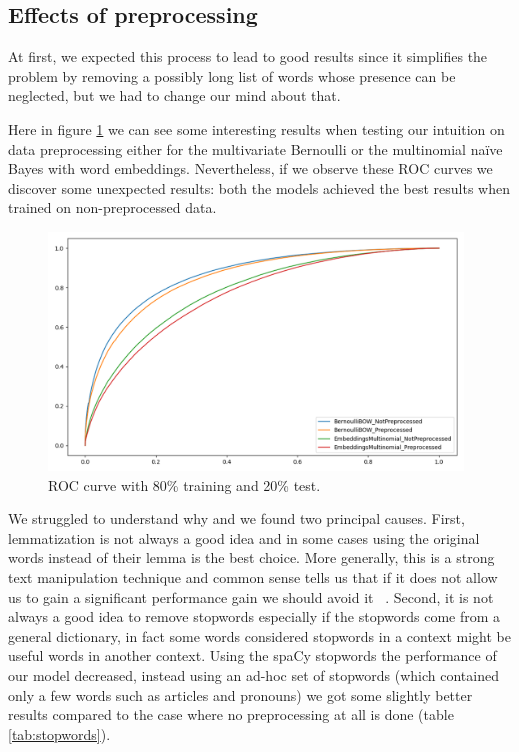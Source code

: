 \documentclass{article}
\begin{document}
    \subsection*{Effects of preprocessing}
    
    At first, we expected this process to lead to good results since it simplifies the problem by removing a possibly long list of words whose presence can be neglected, but we had to change our mind about that.
    
    Here in figure \ref{fig:PREPROCESSING_ROC} we can see some interesting results when testing our intuition on data preprocessing either for the multivariate Bernoulli or the multinomial na\"ive Bayes with word embeddings. 
    Nevertheless, if we observe these ROC curves we discover some unexpected results: both the models achieved the best results when trained on non-preprocessed data.
    
    
    \begin{figure}[h!t]
        \centering
        \includegraphics[width=11cm]{../experiments/plots/preprocessing.png}
        \caption{ROC curve with 80\% training and 20\% test.}
        \label{fig:PREPROCESSING_ROC}
    \end{figure}
    
    
    We struggled to understand why and we found two principal causes.
    First, lemmatization is not always a good idea and in some cases using the original words instead of their lemma is the best choice.
    More generally, this is a strong text manipulation technique and common sense tells us that if it does not allow us to gain a significant performance gain we should avoid it ~\cite{data:lemmatization_tips}. 
    Second, it is not always a good idea to remove stopwords especially if the stopwords come from a general dictionary, in fact some words considered stopwords in a context might be useful words in another context. 
    Using the spaCy stopwords the performance of our model decreased, instead using an ad-hoc set of stopwords (which contained only a few words such as articles and pronouns) we got some slightly better results compared to the case where no preprocessing at all is done (table \ref{tab:stopwords}).
    
\end{document}
